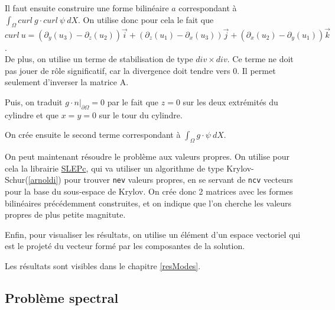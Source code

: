 

Il faut ensuite construire une forme bilinéaire $a$ correspondant à $\int_\Omega curl\ g\cdot curl\ \psi\ dX$. On utilise donc pour cela le fait que $curl\ u = (\partial_y(u_3)-\partial_z(u_2))\vec{i} + (\partial_z(u_1) - \partial_x(u_3))\vec{j} + (\partial_x(u_2)-\partial_y(u_1))\vec{k}$.\\
De plus, on utilise un terme de stabilisation de type $div \times div$. Ce terme ne doit pas jouer de rôle significatif, car la divergence doit tendre vers 0. Il permet seulement d'inverser la matrice A.



Puis, on traduit $g\cdot n\big\rvert_{\partial\Omega}=0$ par le fait que $z=0$ sur les deux extrémités du cylindre et que $x=y=0$ sur le tour du cylindre.



On crée ensuite le second terme correspondant à $\int_\Omega g\cdot\psi\ dX$.



On peut maintenant résoudre le problème aux valeurs propres. On utilise pour cela la librairie \href{http://www.grycap.upv.es/slepc/}{SLEPc}, qui va utiliser un algorithme de type Krylov-Schur(\ref{arnoldi}) pour trouver \texttt{nev} valeurs propres, en se servant de \texttt{ncv} vecteurs pour la base du sous-espace de Krylov. On crée donc 2 matrices avec les formes bilinéaires précédemment construites, et on indique que l'on cherche les valeurs propres de plus petite magnitute.



Enfin, pour visualiser les résultats, on utilise un élément d'un espace vectoriel qui est le projeté du vecteur formé par les composantes de la solution.



Les résultats sont visibles dans le chapitre \ref{resModes}.

\fi

\subsection{Problème spectral}

